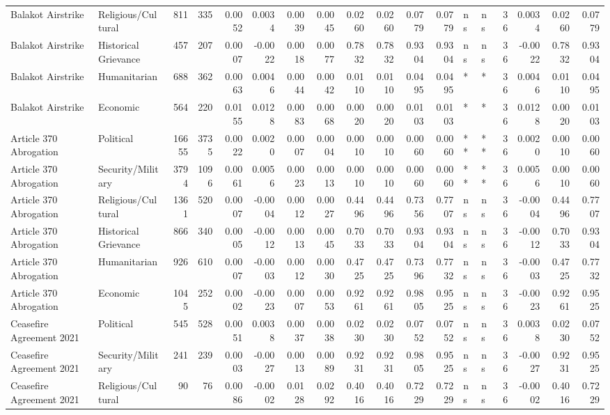 \begin{longtable}{llrrrrrrrrrrllrrrr}
Balakot Airstrike & Religious/Cultural & 811 & 335 & 0.0052 & 0.0034 & 0.0039 & 0.0045 & 0.0260 & 0.0260 & 0.0779 & 0.0779 & ns & ns & 36 & 0.0034 & 0.0260 & 0.0779 \\
Balakot Airstrike & Historical Grievance & 457 & 207 & 0.0007 & -0.0022 & 0.0018 & 0.0077 & 0.7832 & 0.7832 & 0.9304 & 0.9304 & ns & ns & 36 & -0.0022 & 0.7832 & 0.9304 \\
Balakot Airstrike & Humanitarian & 688 & 362 & 0.0063 & 0.0046 & 0.0044 & 0.0042 & 0.0110 & 0.0110 & 0.0495 & 0.0495 & * & * & 36 & 0.0046 & 0.0110 & 0.0495 \\
Balakot Airstrike & Economic & 564 & 220 & 0.0155 & 0.0128 & 0.0083 & 0.0068 & 0.0020 & 0.0020 & 0.0103 & 0.0103 & * & * & 36 & 0.0128 & 0.0020 & 0.0103 \\
Article 370 Abrogation & Political & 16655 & 3735 & 0.0022 & 0.0020 & 0.0007 & 0.0004 & 0.0010 & 0.0010 & 0.0060 & 0.0060 & ** & ** & 36 & 0.0020 & 0.0010 & 0.0060 \\
Article 370 Abrogation & Security/Military & 3794 & 1096 & 0.0061 & 0.0056 & 0.0023 & 0.0013 & 0.0010 & 0.0010 & 0.0060 & 0.0060 & ** & ** & 36 & 0.0056 & 0.0010 & 0.0060 \\
Article 370 Abrogation & Religious/Cultural & 1361 & 520 & 0.0007 & -0.0004 & 0.0012 & 0.0027 & 0.4496 & 0.4496 & 0.7356 & 0.7707 & ns & ns & 36 & -0.0004 & 0.4496 & 0.7707 \\
Article 370 Abrogation & Historical Grievance & 866 & 340 & 0.0005 & -0.0012 & 0.0013 & 0.0045 & 0.7033 & 0.7033 & 0.9304 & 0.9304 & ns & ns & 36 & -0.0012 & 0.7033 & 0.9304 \\
Article 370 Abrogation & Humanitarian & 926 & 610 & 0.0007 & -0.0003 & 0.0012 & 0.0030 & 0.4725 & 0.4725 & 0.7396 & 0.7732 & ns & ns & 36 & -0.0003 & 0.4725 & 0.7732 \\
Article 370 Abrogation & Economic & 1045 & 252 & 0.0002 & -0.0023 & 0.0007 & 0.0053 & 0.9261 & 0.9261 & 0.9805 & 0.9525 & ns & ns & 36 & -0.0023 & 0.9261 & 0.9525 \\
Ceasefire Agreement 2021 & Political & 545 & 528 & 0.0051 & 0.0038 & 0.0037 & 0.0038 & 0.0230 & 0.0230 & 0.0752 & 0.0752 & ns & ns & 36 & 0.0038 & 0.0230 & 0.0752 \\
Ceasefire Agreement 2021 & Security/Military & 241 & 239 & 0.0003 & -0.0027 & 0.0013 & 0.0089 & 0.9231 & 0.9231 & 0.9805 & 0.9525 & ns & ns & 36 & -0.0027 & 0.9231 & 0.9525 \\
Ceasefire Agreement 2021 & Religious/Cultural & 90 & 76 & 0.0086 & -0.0002 & 0.0128 & 0.0292 & 0.4016 & 0.4016 & 0.7229 & 0.7229 & ns & ns & 36 & -0.0002 & 0.4016 & 0.7229 \\

\end{longtable}
